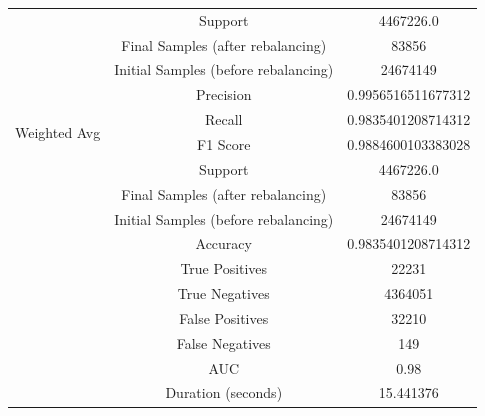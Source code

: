 \begin{longtable}{|c|c|c|}
 & Support & 4467226.0 \\
 & Final Samples (after rebalancing) & 83856 \\
 & Initial Samples (before rebalancing) & 24674149 \\
\hline
\multirow{4}{*}{Weighted Avg} & Precision & 0.9956516511677312 \\
 & Recall & 0.9835401208714312 \\
 & F1 Score & 0.9884600103383028 \\
 & Support & 4467226.0 \\
 & Final Samples (after rebalancing) & 83856 \\
 & Initial Samples (before rebalancing) & 24674149 \\
\hline
& Accuracy & 0.9835401208714312 \\ \hline
& True Positives & 22231 \\ \hline
& True Negatives & 4364051 \\ \hline
& False Positives & 32210 \\ \hline
& False Negatives & 149 \\ \hline
& AUC & 0.98 \\ \hline
& Duration (seconds) & 15.441376 \\ \hline
\end{longtable}


